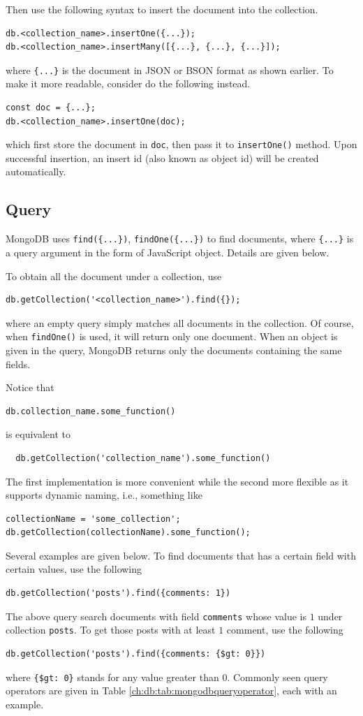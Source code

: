 Then use the following syntax to insert the document into the collection.
\begin{lstlisting}
db.<collection_name>.insertOne({...});
db.<collection_name>.insertMany([{...}, {...}, {...}]);
\end{lstlisting}
where \verb|{...}| is the document in JSON or BSON format as shown earlier. To make it more readable, consider do the following instead.
\begin{lstlisting}
const doc = {...};
db.<collection_name>.insertOne(doc);
\end{lstlisting}
which first store the document in \verb|doc|, then pass it to \verb|insertOne()| method. Upon successful insertion, an insert id (also known as object id) will be created automatically.

\subsection{Query}

MongoDB uses \verb|find({...})|, \verb|findOne({...})| to find documents, where \verb|{...}| is a query argument in the form of JavaScript object. Details are given below.

To obtain all the document under a collection, use
\begin{lstlisting}
db.getCollection('<collection_name>').find({});
\end{lstlisting}
where an empty query simply matches all documents in the collection. Of course, when \verb|findOne()| is used, it will return only one document. When an object is given in the query, MongoDB returns only the documents containing the same fields.

Notice that
\begin{lstlisting}
db.collection_name.some_function()
\end{lstlisting}
is equivalent to
\begin{lstlisting}	db.getCollection('collection_name').some_function()
\end{lstlisting}
The first implementation is more convenient while the second more flexible as it supports dynamic naming, i.e., something like
\begin{lstlisting}
collectionName = 'some_collection';
db.getCollection(collectionName).some_function();
\end{lstlisting}

Several examples are given below. To find documents that has a certain field with certain values, use the following
\begin{lstlisting}
db.getCollection('posts').find({comments: 1})
\end{lstlisting}
The above query search documents with field \verb|comments| whose value is $1$ under collection \verb|posts|. To get those posts with at least $1$ comment, use the following
\begin{lstlisting}
db.getCollection('posts').find({comments: {$gt: 0}})
\end{lstlisting}
where \verb|{$gt: 0}| stands for any value greater than $0$. Commonly seen query operators are given in Table \ref{ch:db:tab:mongodbqueryoperator}, each with an example.

